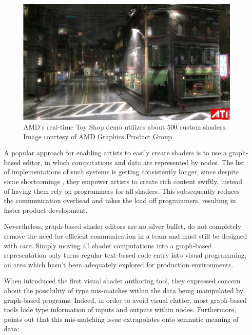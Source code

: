 \begin{figure}[h!]
  \centering
    \includegraphics[width=0.9\linewidth]{./Chapters/ati-demo-toyshop.jpg}
    \caption[ToyShop demo]{AMD's real-time Toy Shop demo utilizes about 500 custom shaders. Image courtesy of AMD Graphics Product Group}
  \label{fig:ATItoyshop}
\end{figure}

A popular approach for enabling artists to easily create shaders is to use a graph-based editor, in which computations and data are represented by nodes. The list of implementations of such systems is getting consistently longer, since despite some shortcomings \cite{ChristerGraphShaderEditorsSuck}, they empower artists to create rich content swiftly, instead of having them rely on programmers for all shaders. This subsequently reduces the communication overhead and takes the load off programmers, resulting in faster product development.

Nevertheless, graph-based shader editors are no silver bullet, do not completely remove the need for efficient communication in a team and must still be designed with care. Simply moving all shader computations into a graph-based representation only turns regular text-based code entry into visual programming, an area which hasn't been adequately explored for production environments.

When \citet{AbramWhitted90} introduced the first visual shader authoring tool, they expressed concern about the possibility of type mis-matches within the data being manipulated by graph-based programs. Indeed, in order to avoid visual clutter, most graph-based tools hide type information of inputs and outputs within nodes. Furthermore, \citet{mcguire2006shadetrees} points out that this mis-matching issue extrapolates onto semantic meaning of data:
	
